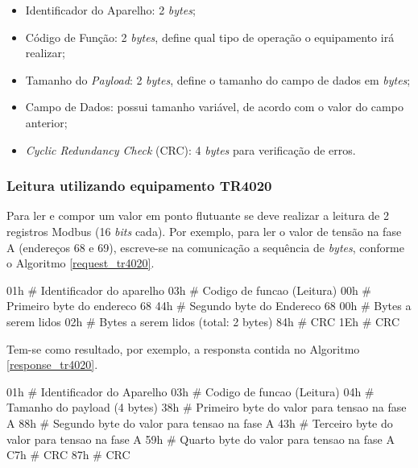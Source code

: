     \begin{itemize}
        \item Identificador do Aparelho: 2 \textit{bytes};
        \item Código de Função: 2 \textit{bytes}, define qual tipo de operação o equipamento irá realizar;
        \item Tamanho do \textit{Payload}: 2 \textit{bytes}, define o tamanho do campo de dados em \textit{bytes};
        \item Campo de Dados: possui tamanho variável, de acordo com o valor do campo anterior;
        \item \textit{Cyclic Redundancy Check} (CRC): 4 \textit{bytes} para verificação de erros.
    \end{itemize}

    \subsubsection{Leitura utilizando equipamento TR4020}
    Para ler e compor um valor em ponto flutuante \cite{ieee754} se deve realizar a leitura de 2 registros Modbus (16 \textit{bits} cada). Por exemplo, para ler o valor de tensão na fase A (endereços 68 e 69), escreve-se na comunicação a sequência de \textit{bytes}, conforme o Algoritmo \ref{request_tr4020}.

    \begin{python}[caption={Requisição para leitura de tensão na fase A, utilizando TR4020.}, captionpos=b, label={request_tr4020}]
    01h # Identificador do aparelho
    03h # Codigo de funcao (Leitura)
    00h # Primeiro byte do endereco 68
    44h # Segundo byte do Endereco 68
    00h # Bytes a serem lidos
    02h # Bytes a serem lidos (total: 2 bytes)
    84h # CRC
    1Eh # CRC
    \end{python}

    Tem-se como resultado, por exemplo, a responsta contida no Algoritmo \ref{response_tr4020}.

    \begin{python}[caption={Resposta para leitura de tensão na fase A, utilizando TR4020.}, captionpos=b, label={response_tr4020}]
    01h # Identificador do Aparelho
    03h # Codigo de funcao (Leitura)
    04h # Tamanho do payload (4 bytes)
    38h # Primeiro byte do valor para tensao na fase A
    88h # Segundo byte do valor para tensao na fase A
    43h # Terceiro byte do valor para tensao na fase A
    59h # Quarto byte do valor para tensao na fase A
    C7h # CRC
    87h # CRC
    \end{python}

